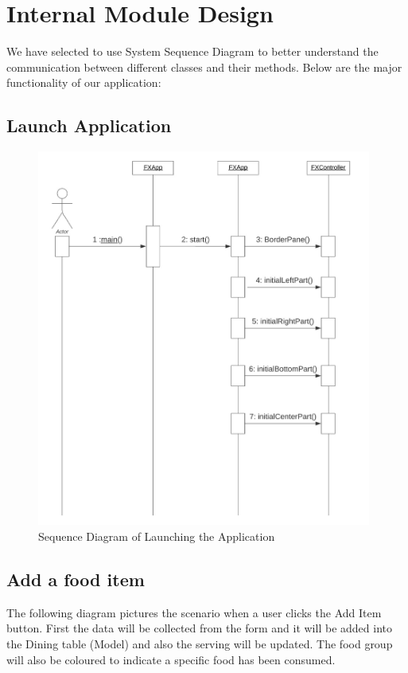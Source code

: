 \documentclass{scrreprt}
\begin{document}
\chapter{Internal Module Design}

We have selected to use System Sequence Diagram to better understand the communication between different classes and their methods. Below are the major functionality of our application:

\section{Launch Application}

\begin{figure}[!htbp]
\centering
\includegraphics[width=11cm]{pictures/launch-app.png}
\caption*{Sequence Diagram of Launching the Application}
\end{figure}

\FloatBarrier

\section{Add a food item}

The following diagram pictures the scenario when a user clicks the Add Item button. First the data will be collected from the form and it will be added into the Dining table (Model) and also the serving will be updated. The food group will also be coloured to indicate a specific food has been consumed.
\end{document}
